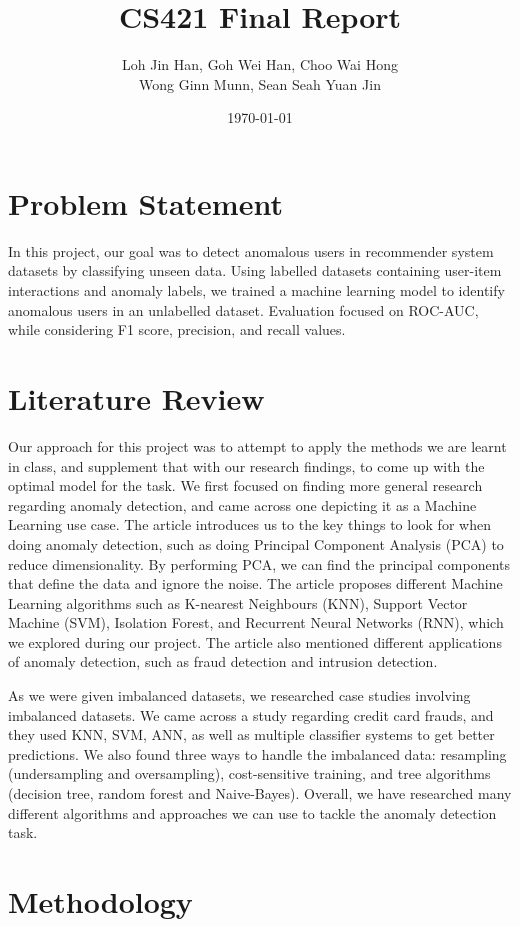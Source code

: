 \documentclass[12pt]{article}
\title{CS421 Final Report}
\author{Loh Jin Han, Goh Wei Han, Choo Wai Hong\\Wong Ginn Munn, Sean Seah Yuan Jin}
\date{\today}
\begin{document}
\maketitle
\tableofcontents
\pagebreak
\section{Problem Statement}
In this project, our goal was to detect anomalous users in recommender system datasets by classifying unseen data. Using labelled datasets containing user-item interactions and anomaly labels, we trained a machine learning model to identify anomalous users in an unlabelled dataset. Evaluation focused on ROC-AUC, while considering F1 score, precision, and recall values.

\section{Literature Review}
Our approach for this project was to attempt to apply the methods we are learnt in class, and supplement that with our research findings, to come up with the optimal model for the task. We first focused on finding more general research regarding anomaly detection, and came across one depicting it as a Machine Learning use case. \cite{kuangHaoAnomalyDetection} The article introduces us to the key things to look for when doing anomaly detection, such as doing Principal Component Analysis (PCA) to reduce dimensionality. By performing PCA, we can find the principal components that define the data and ignore the noise. The article proposes different Machine Learning algorithms such as K-nearest Neighbours (KNN), Support Vector Machine (SVM), Isolation Forest, and Recurrent Neural Networks (RNN), which we explored during our project. The article also mentioned different applications of anomaly detection, such as fraud detection and intrusion detection.

As we were given imbalanced datasets, we researched case studies involving imbalanced datasets. We came across a study regarding credit card frauds, and they used KNN, SVM, ANN, as well as multiple classifier systems to get better predictions. \cite{8985298} We also found three ways to handle the imbalanced data: resampling (undersampling and oversampling), cost-sensitive training, and tree algorithms (decision tree, random forest and Naive-Bayes). \cite{Mînăstireanu_Meşniţă_2020} Overall, we have researched many different algorithms and approaches we can use to tackle the anomaly detection task.
\section{Methodology}
\end{document}
